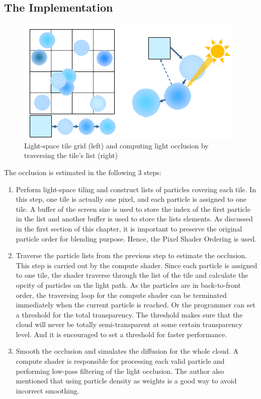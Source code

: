 \subsection{The Implementation}
\begin{figure}[htp]
\begin{center}
\includegraphics[scale=0.7]{images/occlusion.png}
\caption{Light-space tile grid (left) and computing light occlusion
by traversing the tile’s list (right)}
\label{f14}
\end{center}
\end{figure}

The occlusion is estimated in the following 3 steps:
\begin{enumerate}
\item Perform light-space tiling and construct lists of particles
covering each tile. In this step, one tile is actually one pixel, and each particle is assigned to one tile. A buffer of the screen size is used to store the index of the first particle in the list and another buffer is used to store the lists elements. As discussed in the first section of this chapter, it is important to preserve the original particle order for blending purpose. Hence, the Pixel Shader Ordering is used.
\item Traverse the particle lists from the previous step to estimate the occlusion. This step is carried out by the compute shader. Since each particle is assigned to one tile, the shader traverse through the list of the tile and calculate the opcity of particles on the light path. As the particles are in back-to-front order, the traversing loop for the compute shader can be terminated immediately when the current particle is reached. Or the programmer can set a threshold for the total transparency. The threshold makes sure that the cloud will never be totally semi-transparent at some certain transparency level. And it is encouraged to set a threshold for faster performance.
\item Smooth the occlusion and simulates the diffusion for the whole cloud. A compute shader is responsible for processing each valid particle and performing low-pass filtering of the light occlusion. The author also mentioned that using particle density as weights is a good way to avoid incorrect smoothing.
\end{enumerate}


